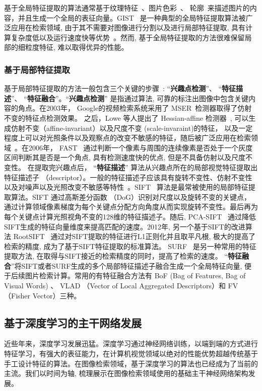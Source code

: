 基于全局特征提取的算法通常基于纹理特征~\cite{park2002fast,wang2014content}、图片色彩~\cite{wang2011interactive}\cite{wengert2011bag}、 轮廓~\cite{wang2006large}来描述图片的内容，并且生成一个全局的表征向量。GIST~\cite{friedman1979framing,torralba2003context} 是一种典型的全局特征提取算法被广泛应用在检索领域, 由于其不需要对图像进行分割以及进行局部特征提取, 具有计算复杂度低以及运行速度快等优势~\cite{zhou2017recent}。然而, 基于全局特征提取的方法很难保留局部的细粒度特征, 难以取得优异的性能。
\subsubsection{基于局部特征提取}
基于局部特征提取的方法一般包含三个关键的步骤~\cite{zhou2017recent}: ``\textbf{兴趣点检测}''、 ``\textbf{特征描述}''、 ``\textbf{特征融合}''。``\textbf{兴趣点检测}'' 是指通过算法, 可靠的标注出图像中包含关键内容的角点。在2003年， Google的视频检索系统采用了 MSER~\cite{matas2004robust}检测器取得了仿射不变的特征点检测效果。 之后，Lowe 等人提出了 Hessian-affine 检测器~\cite{lowe2004distinctive}, 可以生成仿射不变（affine-invariant）以及尺度不变 (scale-invaraint)的特征， 以及一定程度上可以对光照条件以及观察点的改变不敏感的特征，随后被广泛应用在检索领域~\cite{philbin2007object}。在2006年， FAST~\cite{rosten2008faster} 通过判断一个像素与周围的连续像素是否处于一个灰度区间判断其是否是一个角点, 具有检测速度快的优点, 但是不具备仿射以及尺度不变性。 在提取完兴趣点后， ``\textbf{特征描述}'' 算法从兴趣点所在的局部视觉特征提取出特征描述子 （descriptor）。一般的特征描述子应该具有旋转不变性、仿射不变性以及对噪声以及光照改变不敏感等特性~\cite{zhou2017recent}。SIFT ~\cite{lowe2004distinctive}算法是最常被使用的局部特征提取算法。SIFT 通过高斯差分函数 （DoG）识别对尺度以及旋转不变的关键点，通过计算领域像素梯度为每个关键点分配方向角度从而实现旋转不变性。最后再为每个关键点计算光照视角不变的128维的特征描述子。随后, PCA-SIFT~\cite{ke2004pca} 通过降低SIFT生成的特征向量维度来提高匹配的速度。2012年, 另一个基于SIFT的改进算法 RootSIFT~\cite{arandjelovic2012three} 通过对SIFT提取的特征进行L1正则化并且取平凡根, 极大的提高了检索的精度, 成为了基于SIFT特征提取的标准算法。 SURF~\cite{bay2006surf} 是另一种常用的特征提取方法, 在取得与SIFT接近的检索精度的同时，提高了检索的速度。 ``\textbf{特征融合}''将SIFT或者SURF生成的多个局部特征描述子融合生成一个全局特征向量, 便于后续图片检索计算。常用的有特征融合方法有 BoF (Bag of Features, Bag of Visual Words) 、 VLAD （Vector of Local Aggregated Descriptors）和 FV （Fisher Vector）三种。
\subsection{基于深度学习的主干网络发展}
近些年来，深度学习发展迅猛。深度学习通过神经网络训练，以端到端的方式进行特征学习，有强大的表征能力，在计算机视觉领域以绝对的性能优势超越传统基于手工设计特征的算法。在图像检索领域，基于深度学习的算法也已经成为了当前的主流。我们以时间为轴, 梳理展示在图像检索领域使用的基础主干神经网络架构发展。
